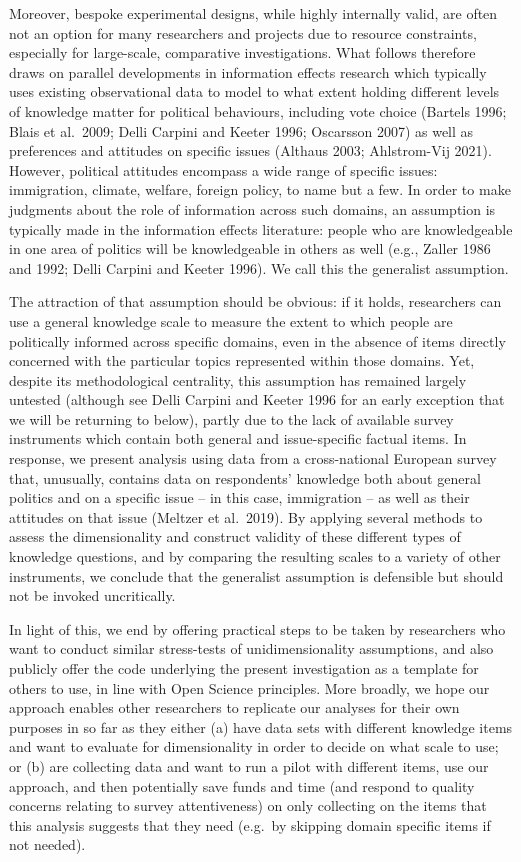 \documentclass[11pt,halfline,a4paper,]{ouparticle}
\begin{document}
Moreover, bespoke experimental designs, while highly internally valid,
are often not an option for many researchers and projects due to
resource constraints, especially for large-scale, comparative
investigations. What follows therefore draws on parallel developments in
information effects research which typically uses existing observational
data to model to what extent holding different levels of knowledge
matter for political behaviours, including vote choice (Bartels 1996;
Blais et al.~2009; Delli Carpini and Keeter 1996; Oscarsson 2007) as
well as preferences and attitudes on specific issues (Althaus 2003;
Ahlstrom-Vij 2021). However, political attitudes encompass a wide range
of specific issues: immigration, climate, welfare, foreign policy, to
name but a few. In order to make judgments about the role of information
across such domains, an assumption is typically made in the information
effects literature: people who are knowledgeable in one area of politics
will be knowledgeable in others as well (e.g., Zaller 1986 and 1992;
Delli Carpini and Keeter 1996). We call this the generalist assumption.

The attraction of that assumption should be obvious: if it holds,
researchers can use a general knowledge scale to measure the extent to
which people are politically informed across specific domains, even in
the absence of items directly concerned with the particular topics
represented within those domains. Yet, despite its methodological
centrality, this assumption has remained largely untested (although see
Delli Carpini and Keeter 1996 for an early exception that we will be
returning to below), partly due to the lack of available survey
instruments which contain both general and issue-specific factual items.
In response, we present analysis using data from a cross-national
European survey that, unusually, contains data on respondents' knowledge
both about general politics and on a specific issue -- in this case,
immigration -- as well as their attitudes on that issue (Meltzer et
al.~2019). By applying several methods to assess the dimensionality and
construct validity of these different types of knowledge questions, and
by comparing the resulting scales to a variety of other instruments, we
conclude that the generalist assumption is defensible but should not be
invoked uncritically.

In light of this, we end by offering practical steps to be taken by
researchers who want to conduct similar stress-tests of
unidimensionality assumptions, and also publicly offer the code
underlying the present investigation as a template for others to use, in
line with Open Science principles. More broadly, we hope our approach
enables other researchers to replicate our analyses for their own
purposes in so far as they either (a) have data sets with different
knowledge items and want to evaluate for dimensionality in order to
decide on what scale to use; or (b) are collecting data and want to run
a pilot with different items, use our approach, and then potentially
save funds and time (and respond to quality concerns relating to survey
attentiveness) on only collecting on the items that this analysis
suggests that they need (e.g.~by skipping domain specific items if not
needed).
\end{document}
